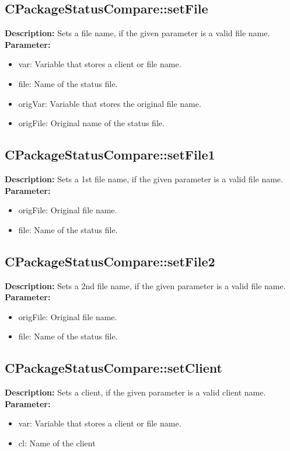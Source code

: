 \subsection{CPackageStatusCompare::setFile}
\textbf{Description:} Sets a file name, if the given parameter is a valid file name.\\
\textbf{Parameter:}
\begin{itemize}
\item var: Variable that stores a client or file name.
\item file: Name of the status file.
\item origVar: Variable that stores the original file name.
\item origFile: Original name of the status file.
\end{itemize}

\subsection{CPackageStatusCompare::setFile1}
\textbf{Description:} Sets a 1st file name, if the given parameter is a valid file name.\\
\textbf{Parameter:}
\begin{itemize}
\item origFile: Original file name.
\item file: Name of the status file.
\end{itemize}

\subsection{CPackageStatusCompare::setFile2}
\textbf{Description:} Sets a 2nd file name, if the given parameter is a valid file name.\\
\textbf{Parameter:}
\begin{itemize}
\item origFile: Original file name.
\item file: Name of the status file.
\end{itemize}

\subsection{CPackageStatusCompare::setClient}
\textbf{Description:} Sets a client, if the given parameter is a valid client name.\\
\textbf{Parameter:}
\begin{itemize}
\item var: Variable that stores a client or file name.
\item cl: Name of the client
\end{itemize}

